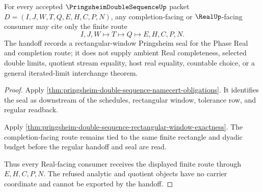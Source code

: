 \begin{theorem}
\label{thm:pringsheim-double-sequence-real-seal-handoff}
For every accepted $\PringsheimDoubleSequenceUp$ packet $D=(I,J,W,T,Q,E,H,C,P,N)$, any completion-facing or $\RealUp$-facing consumer may cite only the finite route
$$
I,J,W \longmapsto T \longmapsto Q \longmapsto E,H,C,P,N .
$$
The handoff records a rectangular-window Pringsheim seal for the Phase Real and completion route; it does not supply ambient Real completeness, selected double limits, quotient stream equality, host real equality, countable choice, or a general iterated-limit interchange theorem.
\end{theorem}
\begin{proof}
Apply \autoref{thm:pringsheim-double-sequence-namecert-obligations}. It identifies the seal as downstream of the schedules, rectangular window, tolerance row, and regular readback.

Apply \autoref{thm:pringsheim-double-sequence-rectangular-window-exactness}. The completion-facing route remains tied to the same finite rectangle and dyadic budget before the regular handoff and seal are read.

Thus every Real-facing consumer receives the displayed finite route through $E,H,C,P,N$. The refused analytic and quotient objects have no carrier coordinate and cannot be exported by the handoff.
\end{proof}




